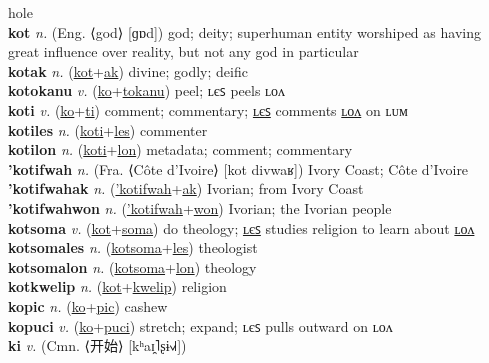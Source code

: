 hole \label{kokilyot} \\
\textbf{kot} \textit{n.} (Eng. ⟨god⟩ [ɡɒd])
god; deity; superhuman entity worshiped as having great influence over reality, but not any god in particular \label{kot} \\
\textbf{kotak} \textit{n.} (\hyperref[kot]{kot}+\hyperref[ak]{ak})
divine; godly; deific \label{kotak} \\
\textbf{kotokanu} \textit{v.} (\hyperref[ko]{ko}+\hyperref[tokanu]{tokanu})
peel; ʟєꜱ peels ʟᴏᴧ \label{kotokanu} \\
\textbf{koti} \textit{v.} (\hyperref[ko]{ko}+\hyperref[ti]{ti})
comment; commentary; \hyperref[kotiles]{ʟєꜱ} comments \hyperref[kotilon]{ʟᴏᴧ} on ʟᴜᴍ \label{koti} \\
\textbf{kotiles} \textit{n.} (\hyperref[koti]{koti}+\hyperref[les]{les})
commenter \label{kotiles} \\
\textbf{kotilon} \textit{n.} (\hyperref[koti]{koti}+\hyperref[lon]{lon})
metadata; comment; commentary \label{kotilon} \\
\textbf{'kotifwah} \textit{n.} (Fra. ⟨Côte d'Ivoire⟩ [kot divwaʁ])
Ivory Coast; Côte d'Ivoire \label{'kotifwah} \\
\textbf{'kotifwahak} \textit{n.} (\hyperref['kotifwah]{'kotifwah}+\hyperref[ak]{ak})
Ivorian; from Ivory Coast \label{'kotifwahak} \\
\textbf{'kotifwahwon} \textit{n.} (\hyperref['kotifwah]{'kotifwah}+\hyperref[won]{won})
Ivorian; the Ivorian people \label{'kotifwahwon} \\
\textbf{kotsoma} \textit{v.} (\hyperref[kot]{kot}+\hyperref[soma]{soma})
do theology; \hyperref[kotsomales]{ʟєꜱ} studies religion to learn about \hyperref[kotsomalon]{ʟᴏᴧ} \label{kotsoma} \\
\textbf{kotsomales} \textit{n.} (\hyperref[kotsoma]{kotsoma}+\hyperref[les]{les})
theologist \label{kotsomales} \\
\textbf{kotsomalon} \textit{n.} (\hyperref[kotsoma]{kotsoma}+\hyperref[lon]{lon})
theology \label{kotsomalon} \\
\textbf{kotkwelip} \textit{n.} (\hyperref[kot]{kot}+\hyperref[kwelip]{kwelip})
religion \label{kotkwelip} \\
\textbf{kopic} \textit{n.} (\hyperref[ko]{ko}+\hyperref[pic]{pic})
cashew \label{kopic} \\
\textbf{kopuci} \textit{v.} (\hyperref[ko]{ko}+\hyperref[puci]{puci})
stretch; expand; ʟєꜱ pulls outward on ʟᴏᴧ \label{kopuci} \\
\textbf{ki} \textit{v.} (Cmn. ⟨开始⟩ [kʰaɪ̯˥ʂɨ˧˩˧])
